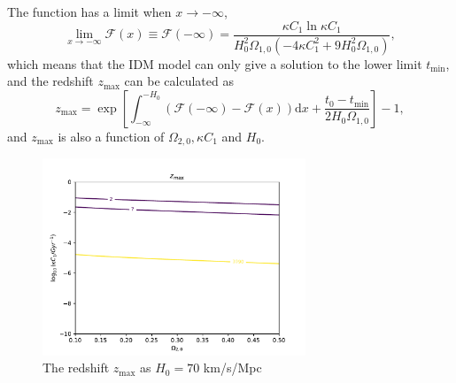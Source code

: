 \documentclass[twocolumn]{aastex631}
\begin{document}
   The function has a limit when $x\to-\infty$,
   \begin{equation}
      \lim_{x\to-\infty}\mathcal{F}(x)\equiv \mathcal{F}(-\infty)=
      \frac{\kappa C_1\ln\kappa C_1}{H_0^2\Omega_{1,0}(-4\kappa C_1^2+9H_0^2\Omega_{1,0})},
   \end{equation}
   which means that the IDM model can only give a solution to the lower limit $t_{\min}$,
   and the redshift $z_{\max}$ can be calculated as
   \begin{equation}
      z_{\max}=\exp\left[\int_{-\infty}^{-H_0}\left(\mathcal{F}(-\infty)
      -\mathcal{F}(x)\right)\mathrm{d}x+\frac{t_0-t_{\min}}{2H_0\Omega_{1,0}}\right]-1,
   \end{equation}
   and $z_{\max}$ is also a function of $\Omega_{2,0}, \kappa C_1$ and $H_0$.
   \begin{figure}[htbp]
      \centering
      \includegraphics[width=0.7\textwidth]{zmax.pdf}
      \caption{The redshift $z_{\max}$ as $H_0=70$ km/s/Mpc}
   \end{figure}



\end{document}
